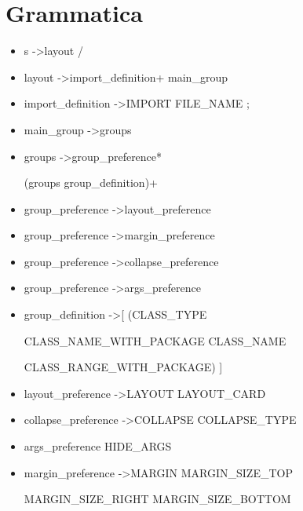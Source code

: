 \section{Grammatica}
\begin{itemize}
\item s   -\textgreater   layout  /

 \item layout   -\textgreater   import{\_}definition+	main{\_}group

 \item import{\_}definition   -\textgreater   IMPORT  FILE{\_}NAME  ;

 \item main{\_}group   -\textgreater   groups

 \item groups   -\textgreater   group{\_}preference*  
 
 (groups \textbar group{\_}definition)+

 \item group{\_}preference   -\textgreater   layout{\_}preference

 \item group{\_}preference   -\textgreater   margin{\_}preference

 \item group{\_}preference   -\textgreater   collapse{\_}preference

 \item group{\_}preference   -\textgreater   args{\_}preference

 \item group{\_}definition   -\textgreater   [  (CLASS{\_}TYPE   
 
 \textbar   CLASS{\_}NAME{\_}WITH{\_}PACKAGE   \textbar   CLASS{\_}NAME   
 
 \textbar   CLASS{\_}RANGE{\_}WITH{\_}PACKAGE)  ]

 \item layout{\_}preference   -\textgreater   LAYOUT  LAYOUT{\_}CARD

 \item collapse{\_}preference   -\textgreater   COLLAPSE  COLLAPSE{\_}TYPE

 \item args{\_}preference  HIDE{\_}ARGS

 \item margin{\_}preference   -\textgreater   MARGIN  MARGIN{\_}SIZE{\_}TOP  
 
 MARGIN{\_}SIZE{\_}RIGHT  MARGIN{\_}SIZE{\_}BOTTOM  
 

\end{itemize}
